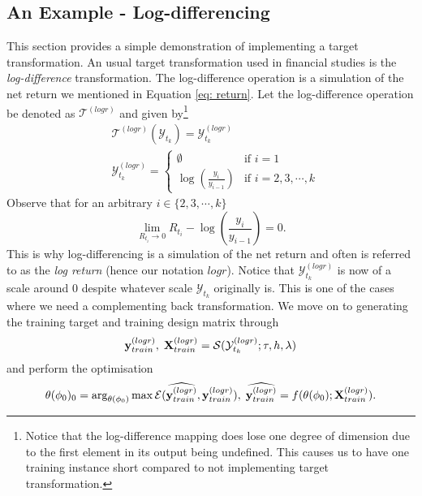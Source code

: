 \subsection{An Example - Log-differencing}
This section provides a simple demonstration of implementing a target transformation. An usual target transformation used in financial studies is the \textit{log-difference} transformation. The log-difference operation is a simulation of the net return we mentioned in Equation \ref{eq: return}. Let the log-difference operation be denoted as $\mathcal{T}^{(logr)}$ and given by\footnote{Notice that the log-difference mapping does lose one degree of dimension due to the first element in its output being undefined. This causes us to have one training instance short compared to not implementing target transformation.}
\begin{align*}
    &\mathcal{T}^{(logr)}(\mathcal{Y}_{t_k}) = \mathcal{Y}^{(logr)}_{t_k} \\
    &\mathcal{Y}^{(logr)}_{t_k} = \begin{cases}
        \emptyset                  &\text{if $i = 1$} \\
        \log(\frac{y_i}{y_{i-1}})  &\text{if $i = 2, 3, \cdots, k$}
    \end{cases}
\end{align*}
Observe that for an arbitrary $i \in \{2, 3, \cdots, k \}$
\begin{equation*}
    \lim_{R_{t_i} \rightarrow 0}{R_{t_i} - \log(\frac{y_i}{y_{i-1}}) = 0}.
\end{equation*}
This is why log-differencing is a simulation of the net return and often is referred to as the \textit{log return} (hence our notation $logr$). Notice that $\mathcal{Y}^{(logr)}_{t_k}$ is now of a scale around $0$ despite whatever scale $\mathcal{Y}_{t_k}$ originally is. This is one of the cases where we need a complementing back transformation. We move on to generating the training target and training design matrix through
\begin{equation*}
    \mathbf{y}^{(logr)}_{train}, \; \mathbf{X}^{(logr)}_{train} = \mathcal{S}(\mathcal{Y}^{(logr)}_{t_k}; \tau, h, \lambda)
\end{equation*}
and perform the optimisation
\begin{equation*}
    \theta(\phi_0)_0 = \arg_{\theta(\phi_0)} \max \mathcal{E}(\widehat{\mathbf{y}^{(logr)}_{train}}, \mathbf{y}^{(logr)}_{train}), \; \widehat{\mathbf{y}^{(logr)}_{train}} = f(\theta(\phi_0); \mathbf{X}^{(logr)}_{train}).
\end{equation*}
